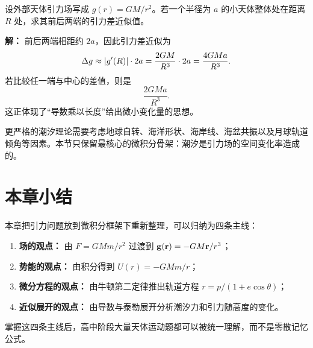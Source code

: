 \begin{example}
设外部天体引力场写成 $g(r)=GM/r^2$。若一个半径为 $a$ 的小天体整体处在距离 $R$ 处，求其前后两端的引力差近似值。

\textbf{解：} 前后两端相距约 $2a$，因此引力差近似为
\[
\Delta g\approx \abs{g'(R)}\cdot 2a=\frac{2GM}{R^3}\cdot 2a=\frac{4GMa}{R^3}.
\]
若比较任一端与中心的差值，则是
\[
\frac{2GMa}{R^3}.
\]
这正体现了“导数乘以长度”给出微小变化量的思想。
\end{example}

\begin{remark}
更严格的潮汐理论需要考虑地球自转、海洋形状、海岸线、海盆共振以及月球轨道倾角等因素。本节只保留最核心的微积分骨架：潮汐是引力场的空间变化率造成的。
\end{remark}

\section*{本章小结}

本章把引力问题放到微积分框架下重新整理，可以归纳为四条主线：
\begin{enumerate}
  \item \textbf{场的观点：} 由 $F=GMm/r^2$ 过渡到 $\vb{g}(\vb{r})=-GM\vb{r}/r^3$；
  \item \textbf{势能的观点：} 由积分得到 $U(r)=-GMm/r$；
  \item \textbf{微分方程的观点：} 由牛顿第二定律推出轨道方程 $r=p/(1+e\cos\theta)$；
  \item \textbf{近似展开的观点：} 由导数与泰勒展开分析潮汐力和引力随高度的变化。
\end{enumerate}
掌握这四条主线后，高中阶段大量天体运动题都可以被统一理解，而不是零散记忆公式。

